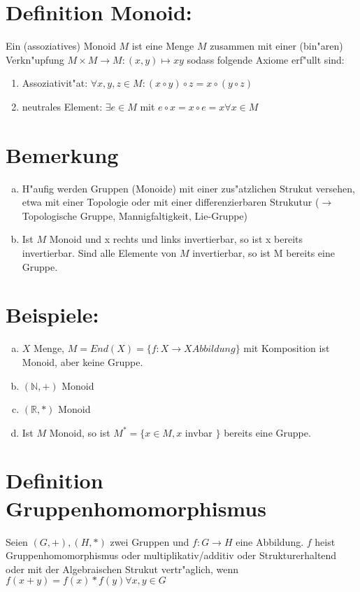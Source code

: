 \documentclass[12pt,a4paper,ngerman]{scrreprt}
\begin{document}
\section{Definition Monoid:}

Ein (assoziatives) Monoid $M$ ist eine Menge $M$ zusammen mit einer (bin"aren) Verkn"upfung 
$M \times M \to M: (x,y) \mapsto xy$ sodass folgende Axiome erf"ullt sind:

\begin{enumerate}[({M}1)]
\item Assoziativit"at: $\forall x,y,z \in M: (x \circ y) \circ z = x \circ ( y \circ z)$
\item neutrales Element: $\exists e \in M$ mit $e \circ x = x \circ e = x \forall x\in M$
\end{enumerate}

\section{Bemerkung}

\begin{enumerate}[(a)]
\item H"aufig werden Gruppen (Monoide) mit einer zus"atzlichen Strukut versehen, etwa mit einer Topologie
oder mit einer differenzierbaren Strukutur ($\to$ Topologische Gruppe, Mannigfaltigkeit, Lie-Gruppe)

\item Ist $M$ Monoid und x rechts und links invertierbar, so ist x bereits invertierbar. 
Sind alle Elemente von $M$ invertierbar, so ist M bereits eine Gruppe.
\end{enumerate}

\section{Beispiele:}
\begin{enumerate}[(a)]
\item $X$ Menge, $M = End(X) = \{f: X\to X Abbildung\}$ mit Komposition ist Monoid, aber keine Gruppe.
\item $(\mathbb{N},+)$ Monoid
\item $(\mathbb{R},*)$ Monoid
\item Ist $M$ Monoid, so ist $M^* = \{x \in M, x$ invbar $\}$ bereits eine Gruppe.
\end{enumerate}

\section{Definition Gruppenhomomorphismus}
Seien $(G,+),(H,*)$ zwei Gruppen und $f: G \to H$ eine Abbildung. $f$ heist Gruppenhomomorphismus oder multiplikativ/additiv 
oder Strukturerhaltend oder mit der Algebraischen Strukut vertr"aglich,
wenn $f(x+y) = f(x)*f(y) \forall x,y \in G$
\end{document}
